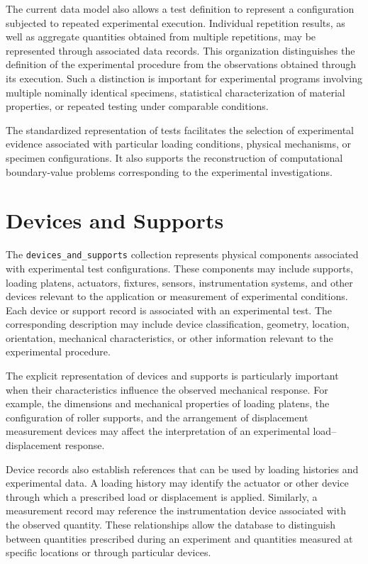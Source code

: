 The current data model also allows
a test definition to represent a
configuration subjected to repeated
experimental execution.
Individual repetition results,
as well as aggregate quantities
obtained from multiple repetitions,
may be represented through
associated data records.
This organization distinguishes
the definition of the experimental
procedure from the observations
obtained through its execution.
Such a distinction is important
for experimental programs involving
multiple nominally identical specimens,
statistical characterization of
material properties, or repeated
testing under comparable conditions.

The standardized representation
of tests facilitates the selection
of experimental evidence associated
with particular loading conditions,
physical mechanisms, or specimen
configurations.
It also supports the reconstruction
of computational boundary-value
problems corresponding to the
experimental investigations.


\section{Devices and Supports}

The \texttt{devices\_and\_supports}
collection represents physical
components associated with
experimental test configurations.
These components may include
supports, loading platens,
actuators, fixtures, sensors,
instrumentation systems, and
other devices relevant to
the application or measurement
of experimental conditions.
Each device or support record
is associated with an experimental
test.
The corresponding description
may include device classification,
geometry, location, orientation,
mechanical characteristics,
or other information relevant
to the experimental procedure.

The explicit representation
of devices and supports is
particularly important when
their characteristics influence
the observed mechanical response.
For example, the dimensions
and mechanical properties of
loading platens, the configuration
of roller supports, and the
arrangement of displacement
measurement devices may affect
the interpretation of an
experimental load--displacement
response.

Device records also establish
references that can be used
by loading histories and
experimental data.
A loading history may identify
the actuator or other device
through which a prescribed
load or displacement is applied.
Similarly, a measurement
record may reference the
instrumentation device
associated with the observed
quantity.
These relationships allow
the database to distinguish
between quantities prescribed
during an experiment and
quantities measured at
specific locations or
through particular devices.

